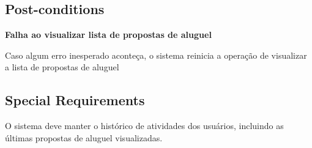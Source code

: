 \subsection*{Post-conditions}

\textbf{Falha ao visualizar lista de propostas de aluguel}

Caso algum erro inesperado aconteça, o sistema reinicia a operação de visualizar a lista de propostas de aluguel

\subsection*{Special Requirements} 
O sistema deve manter o histórico de atividades dos usuários, incluindo as últimas propostas de
aluguel visualizadas.
